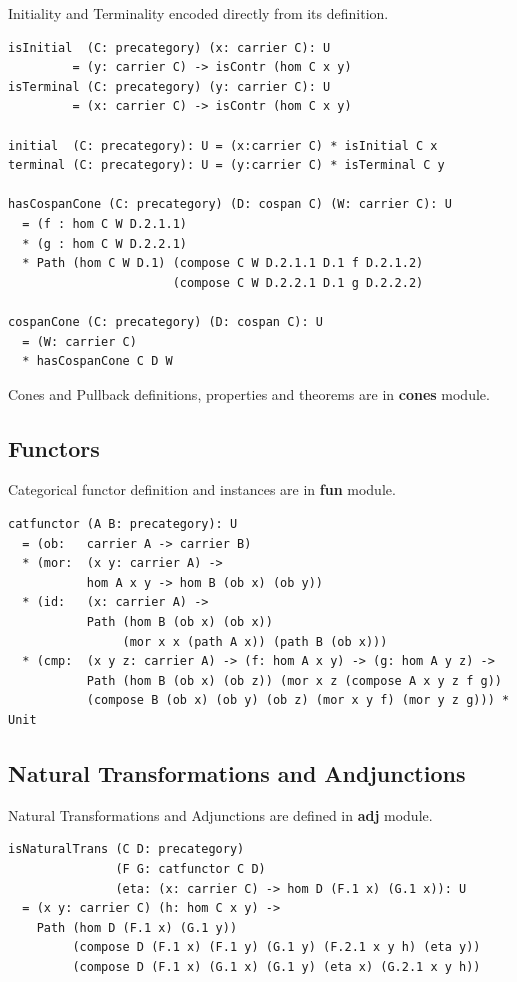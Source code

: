 \documentclass{article}
\begin{document}
Initiality and Terminality encoded directly from its definition.

\begin{lstlisting}[mathescape=true]
isInitial  (C: precategory) (x: carrier C): U
         = (y: carrier C) -> isContr (hom C x y)
isTerminal (C: precategory) (y: carrier C): U
         = (x: carrier C) -> isContr (hom C x y)

initial  (C: precategory): U = (x:carrier C) * isInitial C x
terminal (C: precategory): U = (y:carrier C) * isTerminal C y

hasCospanCone (C: precategory) (D: cospan C) (W: carrier C): U
  = (f : hom C W D.2.1.1)
  * (g : hom C W D.2.2.1)
  * Path (hom C W D.1) (compose C W D.2.1.1 D.1 f D.2.1.2)
                       (compose C W D.2.2.1 D.1 g D.2.2.2)

cospanCone (C: precategory) (D: cospan C): U
  = (W: carrier C)
  * hasCospanCone C D W
\end{lstlisting}

Cones and Pullback definitions, properties and theorems are in {\bf cones} module.

\subsection{Functors}

Categorical functor definition and instances are in {\bf fun} module.

\begin{lstlisting}[mathescape=true]
catfunctor (A B: precategory): U
  = (ob:   carrier A -> carrier B)
  * (mor:  (x y: carrier A) ->
           hom A x y -> hom B (ob x) (ob y))
  * (id:   (x: carrier A) ->
           Path (hom B (ob x) (ob x))
                (mor x x (path A x)) (path B (ob x)))
  * (cmp:  (x y z: carrier A) -> (f: hom A x y) -> (g: hom A y z) ->
           Path (hom B (ob x) (ob z)) (mor x z (compose A x y z f g))
           (compose B (ob x) (ob y) (ob z) (mor x y f) (mor y z g))) * Unit
\end{lstlisting}

\subsection{Natural Transformations and Andjunctions}

Natural Transformations and Adjunctions are defined in {\bf adj} module.

\begin{lstlisting}[mathescape=true]
isNaturalTrans (C D: precategory)
               (F G: catfunctor C D)
               (eta: (x: carrier C) -> hom D (F.1 x) (G.1 x)): U
  = (x y: carrier C) (h: hom C x y) ->
    Path (hom D (F.1 x) (G.1 y))
         (compose D (F.1 x) (F.1 y) (G.1 y) (F.2.1 x y h) (eta y))
         (compose D (F.1 x) (G.1 x) (G.1 y) (eta x) (G.2.1 x y h))
\end{lstlisting}
\end{document}
